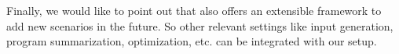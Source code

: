 Finally, we would like to point out that \livecodebench{} also offers an extensible framework to add new scenarios in the future.
So other relevant settings like input generation, program summarization, optimization, etc. can be integrated with our setup.
